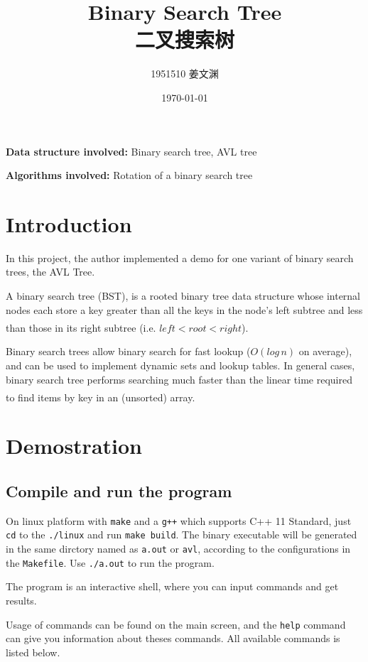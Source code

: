 \documentclass[cn,black,12pt,normal]{elegantnote}
\title{Binary Search Tree\\二叉搜索树}
\author{1951510\; 姜文渊}
\institute{\small \url{https://github.com/jwyjohn/Jwy_DataStructureHomework}}
\date{\today}
\newcommand{\uct}[1]{\textsuperscript{\textsuperscript{\cite{#1}}}}
\begin{document}
\maketitle

\textbf{Data structure involved:} Binary search tree, AVL tree

\textbf{Algorithms involved:} Rotation of a binary search tree

\tableofcontents

\newpage

\section{Introduction}

In this project, the author implemented a demo for one variant of binary search trees, the AVL Tree.

A binary search tree (BST), is a rooted binary tree data structure whose internal nodes each store a key greater than all the keys in the node’s left subtree and less than those in its right subtree (i.e. $left<root<right$).\uct{wiki:Binary_search_tree}

Binary search trees allow binary search for fast lookup ($O(log\,n)$ on average), and can be used to implement dynamic sets and lookup tables. In general cases, binary search tree performs searching much faster than the linear time required to find items by key in an (unsorted) array.\uct{wiki:Binary_search_tree}


\section{Demostration}

\subsection{Compile and run the program}

On linux platform with \lstinline{make} and a \lstinline{g++} which supports C++ 11 Standard, just \lstinline{cd} to the \lstinline{./linux} and run \lstinline{make build}. The binary executable will be generated in the same dirctory named as \lstinline{a.out} or \lstinline{avl}, according to the configurations in the \lstinline{Makefile}. Use \lstinline{./a.out} to run the program.

The program is an interactive shell, where you can input commands and get results.

Usage of commands can be found on the main screen, and the \lstinline{help} command can give you information about theses commands.  All available commands is listed below.
\end{document}
